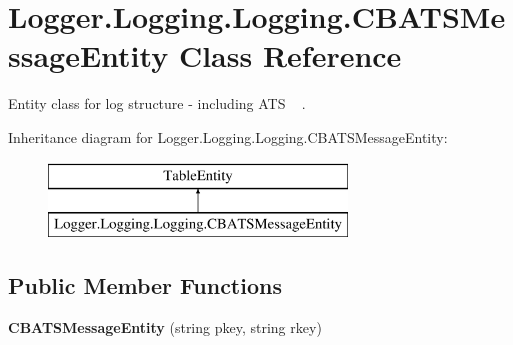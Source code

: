 \hypertarget{a00008}{}\section{Logger.\+Logging.\+Logging.\+C\+B\+A\+T\+S\+Message\+Entity Class Reference}
\label{a00008}


Entity class for log structure -\/ including A\+TS ~\newline
.  


Inheritance diagram for Logger.\+Logging.\+Logging.\+C\+B\+A\+T\+S\+Message\+Entity\+:\begin{figure}[H]
\begin{center}
\leavevmode
\includegraphics[height=2.000000cm]{a00008}
\end{center}
\end{figure}
\subsection*{Public Member Functions}
\begin{DoxyCompactItemize}
\item 
{\bfseries C\+B\+A\+T\+S\+Message\+Entity} (string pkey, string rkey)\hypertarget{a00008_ac00d1ec7e6dd95b76bd5a2d21ec821f3}{}\label{a00008_ac00d1ec7e6dd95b76bd5a2d21ec821f3}

\end{DoxyCompactItemize}
